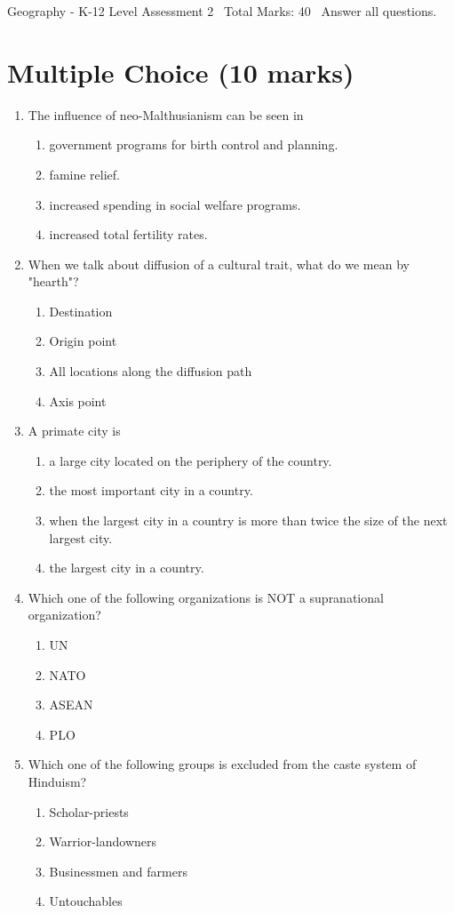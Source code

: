 \documentclass[12pt]{article}
\begin{document}
\begin{center}
Geography - K-12 Level Assessment 2 \
Total Marks: 40 \
Answer all questions.
\end{center}

\section*{Multiple Choice (10 marks)}
\begin{enumerate}[label=\arabic*.]
\item The influence of neo-Malthusianism can be seen in
\begin{enumerate}[label=(\alph*)]
    \item government programs for birth control and planning.
    \item famine relief.
    \item increased spending in social welfare programs.
    \item increased total fertility rates.
\end{enumerate}
\item When we talk about diffusion of a cultural trait, what do we mean by "hearth"?
\begin{enumerate}[label=(\alph*)]
    \item Destination
    \item Origin point
    \item All locations along the diffusion path
    \item Axis point
\end{enumerate}
\item A primate city is
\begin{enumerate}[label=(\alph*)]
    \item a large city located on the periphery of the country.
    \item the most important city in a country.
    \item when the largest city in a country is more than twice the size of the next largest city.
    \item the largest city in a country.
\end{enumerate}
\item Which one of the following organizations is NOT a supranational organization?
\begin{enumerate}[label=(\alph*)]
    \item UN
    \item NATO
    \item ASEAN
    \item PLO
\end{enumerate}
\item Which one of the following groups is excluded from the caste system of Hinduism?
\begin{enumerate}[label=(\alph*)]
    \item Scholar-priests
    \item Warrior-landowners
    \item Businessmen and farmers
    \item Untouchables
\end{enumerate}
\end{enumerate}
\end{document}
